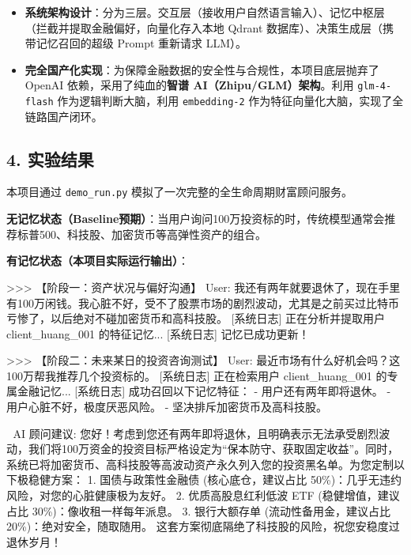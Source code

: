 \documentclass[
]{article}
\newenvironment{Shaded}{}{}
\newcommand{\NormalTok}[1]{#1}
\providecommand{\tightlist}{%
  \setlength{\itemsep}{0pt}\setlength{\parskip}{0pt}}
\begin{document}
\begin{itemize}
\tightlist
\item
  \textbf{系统架构设计}：分为三层。交互层（接收用户自然语言输入）、记忆中枢层（拦截并提取金融偏好，向量化存入本地
  Qdrant 数据库）、决策生成层（携带记忆召回的超级 Prompt 重新请求
  LLM）。
\item
  \textbf{完全国产化实现}：为保障金融数据的安全性与合规性，本项目底层抛弃了
  OpenAI 依赖，采用了纯血的\textbf{智谱 AI（Zhipu/GLM）架构}。利用
  \texttt{glm-4-flash} 作为逻辑判断大脑，利用 \texttt{embedding-2}
  作为特征向量化大脑，实现了全链路国产闭环。
\end{itemize}

\subsection{4. 实验结果}\label{ux5b9eux9a8cux7ed3ux679c}

本项目通过 \texttt{demo\_run.py}
模拟了一次完整的全生命周期财富顾问服务。

\textbf{无记忆状态（Baseline预期）}：当用户询问100万投资标的时，传统模型通常会推荐标普500、科技股、加密货币等高弹性资产的组合。

\textbf{有记忆状态（本项目实际运行输出）}：

\begin{Shaded}
\begin{Highlighting}[]
\NormalTok{\textgreater{}\textgreater{}\textgreater{} 【阶段一：资产状况与偏好沟通】}
\NormalTok{User: 我还有两年就要退休了，现在手里有100万闲钱。我心脏不好，受不了股票市场的剧烈波动，尤其是之前买过比特币亏惨了，以后绝对不碰加密货币和高科技股。}
\NormalTok{[系统日志] 正在分析并提取用户 \textquotesingle{}client\_huang\_001\textquotesingle{} 的特征记忆...}
\NormalTok{[系统日志] 记忆已成功更新！}

\NormalTok{\textgreater{}\textgreater{}\textgreater{} 【阶段二：未来某日的投资咨询测试】}
\NormalTok{User: 最近市场有什么好机会吗？这100万帮我推荐几个投资标的。}
\NormalTok{[系统日志] 正在检索用户 \textquotesingle{}client\_huang\_001\textquotesingle{} 的专属金融记忆...}
\NormalTok{[系统日志] 成功召回以下记忆特征：}
\NormalTok{{-} 用户还有两年即将退休。}
\NormalTok{{-} 用户心脏不好，极度厌恶风险。}
\NormalTok{{-} 坚决排斥加密货币及高科技股。}

\NormalTok{🤖 AI 顾问建议:}
\NormalTok{您好！考虑到您还有两年即将退休，且明确表示无法承受剧烈波动，我们将100万资金的投资目标严格设定为“保本防守、获取固定收益”。同时，系统已将加密货币、高科技股等高波动资产永久列入您的投资黑名单。为您定制以下极稳健方案：}
\NormalTok{1. 国债与政策性金融债 (核心底仓，建议占比 50\%)：几乎无违约风险，对您的心脏健康极为友好。}
\NormalTok{2. 优质高股息红利低波 ETF (稳健增值，建议占比 30\%)：像收租一样每年派息。}
\NormalTok{3. 银行大额存单 (流动性备用金，建议占比 20\%)：绝对安全，随取随用。}
\NormalTok{这套方案彻底隔绝了科技股的风险，祝您安稳度过退休岁月！}
\end{Highlighting}
\end{Shaded}
\end{document}
